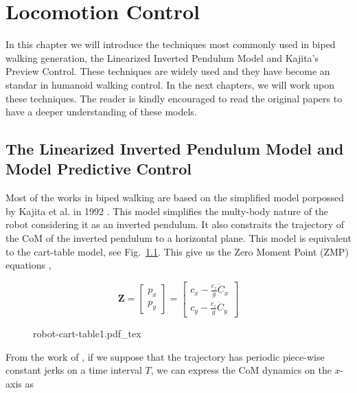 
\chapter{Locomotion Control} 
\label{Chap:Locomotion-Control}

In this chapter we will introduce the techniques most commonly used in biped walking generation, the Linearized Inverted Pendulum Model and Kajita's Preview Control. These techniques are widely used and they have become an standar in humanoid walking control. In the next chapters, we will work upon these techniques. The reader is kindly encouraged to read the original papers to have a deeper understanding of these models.


\section{The Linearized Inverted Pendulum Model and Model Predictive Control}
Most of the works in biped walking are based on the simplified model porpossed by Kajita et al. in 1992 \citep{Kajita1992}. This model simplifies the multy-body nature of the robot considering it as an inverted pendulum. It also constraits the trajectory of the CoM of the inverted pendulum to a horizontal plane. This model is equivalent to the cart-table model, see Fig.~\ref{Fig:Inverted-Pendulum-Cart-Table}. This give us the Zero Moment Point (ZMP) equations \citep{Vukobratovi1972,Vukobratovi2004},

\begin{equation}
\mathbf{Z} = 
\left[
\begin{matrix}
p_x \\ p_y
\end{matrix}
\right] = 
\left[
\begin{matrix}
c_x - \frac{c_z}{g}\ddot{C}_x \\ c_y - \frac{c_z}{g}\ddot{C}_y
\end{matrix}
\right]
\end{equation}

\begin{figure}
  \centering
      {\def\svgwidth{0.5\columnwidth}
        
                   {robot-cart-table1.pdf_tex}}
      \caption[]{}
      \label{Fig:Inverted-Pendulum-Cart-Table}
\end{figure}

From the  work of \citep{Kajita2003}, if we suppose that the trajectory has periodic piece-wise constant jerks on a time interval $T$, we can express the CoM dynamics on the $x$-axis as

